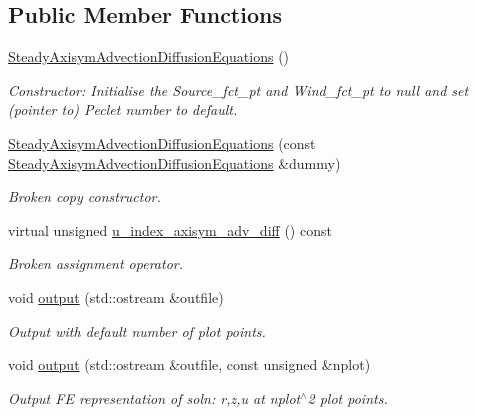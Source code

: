\subsection*{Public Member Functions}
\begin{DoxyCompactItemize}
\item 
\hyperlink{classoomph_1_1SteadyAxisymAdvectionDiffusionEquations_a77d0aecf3d03f5515482b2550c9ba8d4}{Steady\+Axisym\+Advection\+Diffusion\+Equations} ()
\begin{DoxyCompactList}\small\item\em Constructor\+: Initialise the Source\+\_\+fct\+\_\+pt and Wind\+\_\+fct\+\_\+pt to null and set (pointer to) Peclet number to default. \end{DoxyCompactList}\item 
\hyperlink{classoomph_1_1SteadyAxisymAdvectionDiffusionEquations_ada1dff32d8aceaa0b00f7b56a2d9d632}{Steady\+Axisym\+Advection\+Diffusion\+Equations} (const \hyperlink{classoomph_1_1SteadyAxisymAdvectionDiffusionEquations}{Steady\+Axisym\+Advection\+Diffusion\+Equations} \&dummy)
\begin{DoxyCompactList}\small\item\em Broken copy constructor. \end{DoxyCompactList}\item 
virtual unsigned \hyperlink{classoomph_1_1SteadyAxisymAdvectionDiffusionEquations_ab56bb475d2985b9278b9c6a0ba5b89b3}{u\+\_\+index\+\_\+axisym\+\_\+adv\+\_\+diff} () const
\begin{DoxyCompactList}\small\item\em Broken assignment operator. \end{DoxyCompactList}\item 
void \hyperlink{classoomph_1_1SteadyAxisymAdvectionDiffusionEquations_ae34254471ce4bd77abc5ed6ed772bec4}{output} (std\+::ostream \&outfile)
\begin{DoxyCompactList}\small\item\em Output with default number of plot points. \end{DoxyCompactList}\item 
void \hyperlink{classoomph_1_1SteadyAxisymAdvectionDiffusionEquations_a8bfb52d77bb064940b0b82f9e347f323}{output} (std\+::ostream \&outfile, const unsigned \&nplot)
\begin{DoxyCompactList}\small\item\em Output FE representation of soln\+: r,z,u at nplot$^\wedge$2 plot points. \end{DoxyCompactList}\item 

\end{DoxyCompactItemize}
